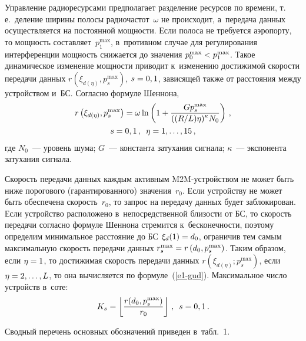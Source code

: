 \begin{multicols}{2}
  Управление радиоресурсами предполагает разделение ресурсов по времени, 
т.\,е.\ деление ширины полосы радиочастот~$\omega$ не происходит, 
а~передача данных осуществляется на постоянной мощности. Если полоса не 
требуется аэропорту, то мощность составляет~$p_1^{\max}$, в~противном 
случае для регулирования интерференции мощность снижается до значения 
$p_0^{\max}\hm<p_1^{\max}$. Такое динамическое изменение мощности 
приводит к~изменению достижимой скорости передачи данных $r\left( 
\xi_{d(\eta)},p_s^{\max}\right)$, $s\hm=0,1$, зависящей также от расстояния 
между устройством и~БС. Согласно формуле Шеннона,
  \begin{multline}
  r\left( \xi_{d(\eta)}, p_s^{\max}\right) =\omega \ln\left( 
1+\displaystyle\frac{\displaystyle Gp_s^{\max}\mathstrut}{\displaystyle ((R/L)\eta)^\kappa N_0\mathstrut}\right)\,,\\ s=0,1\,,\enskip 
\eta=1,\ldots ,15\,,
  \label{e1-gud}
  \end{multline}
где $N_0$~---  уровень шума; $G$~--- константа затухания сигнала; $\kappa$~--- 
экспонента затухания сигнала.

  Скорость передачи данных каждым активным M2M-устройством не может 
быть ниже порогового (гарантированного) значения~$r_0$. Если устройству не 
может быть обеспечена скорость~$r_0$, то запрос на передачу данных будет 
заблокирован. Если устройство расположено в~непосредственной близости от 
БС, то скорость передачи согласно формуле Шеннона стремится 
к~бесконечности, поэтому определим минимальное расстояние до БС 
$\xi_d(1)\hm=d_0$, ограничив тем самым максимальную скорость передачи 
данных $r_s^{\max}\hm= r\left( d_0, p_s^{\max}\right)$. Таким образом, если 
$\eta\hm=1$, то достижимая скорость передачи данных $r\left( \xi_{d(\eta)}; 
p_s^{\max}\right)$, если $\eta\hm=2,\ldots ,L$, то она вычисляется по 
формуле~(\ref{e1-gud}). Максимальное число устройств в~соте:
$$
K_s= \left \lfloor  
\displaystyle\frac{\displaystyle r( d_0, p_s^{\max})\mathstrut}{\displaystyle r_0\mathstrut}\right\rfloor\,,\enskip s=0,1
\,.
$$

  Сводный перечень основных обозначений приведен в~табл.~1.

\end{multicols}

